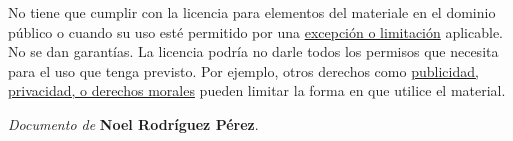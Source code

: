\noindent No tiene que cumplir con la licencia para elementos del materiale en el dominio público o cuando su uso esté permitido por una \href{https://creativecommons.org/licenses/by-sa/4.0/deed.es#ref-exception-or-limitation}{excepción o limitación} aplicable.
No se dan garantías. La licencia podría no darle todos los permisos que necesita para el uso que tenga previsto. Por ejemplo, otros derechos como \href{https://creativecommons.org/licenses/by-sa/4.0/deed.es#ref-publicity-privacy-or-moral-rights}{publicidad, privacidad, o derechos morales} pueden limitar la forma en que utilice el material.

\begin{flushright}
		\vspace{3.0 cm}
		\emph{Documento de} \textbf{Noel Rodríguez Pérez}.
\end{flushright}
